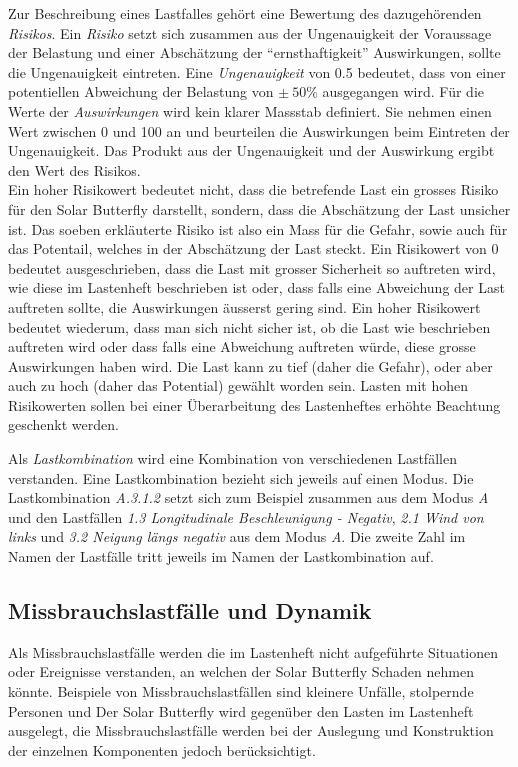 Zur Beschreibung eines Lastfalles gehört eine Bewertung des dazugehörenden \emph{Risikos}. Ein \emph{Risiko} setzt sich zusammen aus der Ungenauigkeit der Voraussage der Belastung und einer Abschätzung der ``ernsthaftigkeit'' Auswirkungen, sollte die Ungenauigkeit eintreten. Eine \emph{Ungenauigkeit} von 0.5 bedeutet, dass von einer potentiellen Abweichung der Belastung von $\pm\: 50\%$ ausgegangen wird. Für die Werte der \emph{Auswirkungen} wird kein klarer Massstab definiert. Sie nehmen einen Wert zwischen 0 und 100 an und beurteilen die Auswirkungen beim Eintreten der Ungenauigkeit. Das Produkt aus der Ungenauigkeit und der Auswirkung ergibt den Wert des Risikos.\\
Ein hoher Risikowert bedeutet nicht, dass die betrefende Last ein grosses Risiko für den Solar Butterfly darstellt, sondern, dass die Abschätzung der Last unsicher ist. Das soeben erkläuterte Risiko ist also ein Mass für die Gefahr, sowie auch für das Potentail, welches in der Abschätzung der Last steckt. Ein Risikowert von 0 bedeutet ausgeschrieben, dass die Last mit grosser Sicherheit so auftreten wird, wie diese im Lastenheft beschrieben ist oder, dass falls eine Abweichung der Last auftreten sollte, die Auswirkungen äusserst gering sind. Ein hoher Risikowert bedeutet wiederum, dass man sich nicht sicher ist, ob die Last wie beschrieben auftreten wird oder dass falls eine Abweichung auftreten würde, diese grosse Auswirkungen haben wird. Die Last kann zu tief (daher die Gefahr), oder aber auch zu hoch (daher das Potential) gewählt worden sein. Lasten mit hohen Risikowerten sollen bei einer Überarbeitung des Lastenheftes erhöhte Beachtung geschenkt werden.

Als \emph{Lastkombination} wird eine Kombination von verschiedenen Lastfällen verstanden. Eine Lastkombination bezieht sich jeweils auf einen Modus. Die Lastkombination \emph{A.3.1.2} setzt sich zum Beispiel zusammen aus dem Modus \emph{A} und den Lastfällen \emph{1.3 Longitudinale Beschleunigung - Negativ}, \emph{2.1 Wind von links} und \emph{3.2 Neigung längs negativ} aus dem Modus \emph{A}. Die zweite Zahl im Namen der Lastfälle tritt jeweils im Namen der Lastkombination auf.

\subsection{Missbrauchslastfälle und Dynamik}
Als Missbrauchslastfälle werden die im Lastenheft nicht aufgeführte Situationen oder Ereignisse verstanden, an welchen der Solar Butterfly Schaden nehmen könnte. Beispiele von Missbrauchslastfällen sind kleinere Unfälle, stolpernde Personen und Der Solar Butterfly wird gegenüber den Lasten im Lastenheft ausgelegt, die Missbrauchslastfälle werden bei der Auslegung und Konstruktion der einzelnen Komponenten jedoch berücksichtigt.

